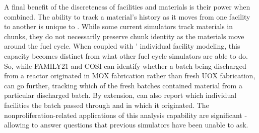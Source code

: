 A final benefit of the discreteness of facilities and materials is their power
when combined. The ability to track a material's history as it moves from one
facility to another is unique to \Cyclus. While some current simulators track
materials in chunks, they do not necessarily preserve chunk identity as the
materials move around the fuel cycle. When coupled with \Cyclus' individual
facility modeling, this capacity becomes distinct from what other fuel cycle
simulators are able to do. So, while FAMILY21 and \gls{COSI} can identify
whether a batch being discharged from a reactor originated in \gls{MOX}
fabrication rather than fresh \gls{UOX} fabrication, \Cyclus can go further,
tracking which of the fresh batches contained material from a particular
discharged batch. By extension, \Cyclus can also report which individual
facilities the batch passed through and in which it originated. The
nonproliferation-related applications of this analysis capability are
significant - allowing \Cyclus to answer questions that previous simulators
have been unable to ask.
